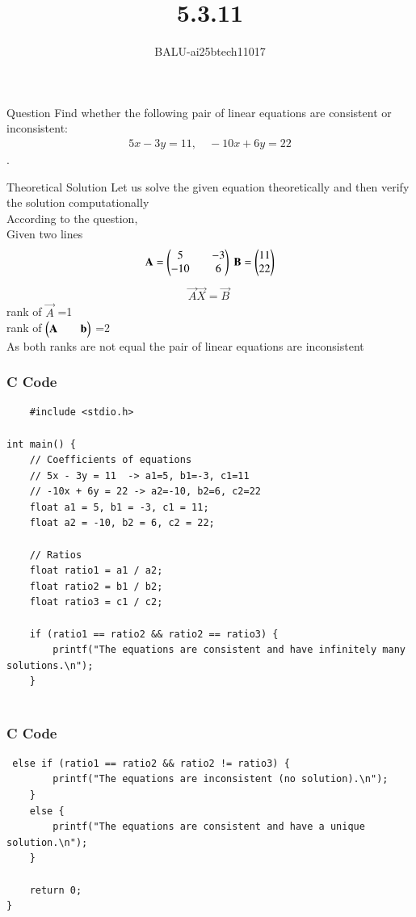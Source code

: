 \documentclass{beamer}
\title %
{5.3.11}
\author %
{BALU-ai25btech11017}
\begin{document}
\frame{\titlepage}
\begin{frame}{Question}
Find whether the following pair of linear equations are consistent or inconsistent:
\begin{align}
5x - 3y = 11, \quad -10x + 6y = 22
\end{align}.\\ 
\end{frame}
\begin{frame}{Theoretical Solution}
Let us solve the given equation theoretically and then verify the solution computationally \\
According to the question, \\
Given two lines\\
\begin{align}
    \Vec{A}=\begin{myvec}{5&&-3\\-10&&6}\end{myvec}\
    \Vec{B}=\begin{myvec}{11\\22}\end{myvec}\\
\end{align}
\begin{align}
    \Vec{A}\Vec{X}=\Vec{B}\
\end{align}
rank of $\Vec{A}$ =1\\
rank of $\myvec{\vec{A}&&\Vec{b}}$ =2\\
As both ranks are not equal the pair of linear equations are inconsistent
\end{frame}
\begin{frame}[fragile]
    \frametitle{C Code}

    \begin{lstlisting}
    #include <stdio.h>

int main() {
    // Coefficients of equations
    // 5x - 3y = 11  -> a1=5, b1=-3, c1=11
    // -10x + 6y = 22 -> a2=-10, b2=6, c2=22
    float a1 = 5, b1 = -3, c1 = 11;
    float a2 = -10, b2 = 6, c2 = 22;

    // Ratios
    float ratio1 = a1 / a2;
    float ratio2 = b1 / b2;
    float ratio3 = c1 / c2;

    if (ratio1 == ratio2 && ratio2 == ratio3) {
        printf("The equations are consistent and have infinitely many solutions.\n");
    } 
   

    \end{lstlisting}
\end{frame}
\begin{frame}[fragile]
    \frametitle{C Code }
    \begin{lstlisting}
 else if (ratio1 == ratio2 && ratio2 != ratio3) {
        printf("The equations are inconsistent (no solution).\n");
    } 
    else {
        printf("The equations are consistent and have a unique solution.\n");
    }

    return 0;
}
    \end{lstlisting}
\end{frame}
\end{document}
